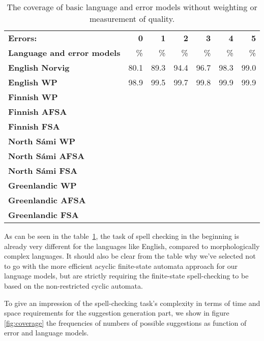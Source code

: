 \documentclass[a4paper,12pt]{article}
\begin{document}
\begin{table}
    \centering
    \begin{tabular}{|l|r|r|r||r|r|r|}
        \hline
        \bf Errors: & \bf 0  & \bf 1 & \bf 2 & \bf 3 & \bf 4 & \bf 5 \\
        \bf Language and error models &  \% & \% & \% & \% & \% & \% \\
        \hline
        \bf English Norvig & 80.1 & 89.3 & 94.4 & 96.7 & 98.3 & 99.0 \\
            \bf English WP & 98.9 & 99.5 & 99.7 & 99.8 & 99.9 & 99.9 \\
        \hline
                   \bf Finnish WP & & & & & & \\
                  \bf Finnish AFSA & & & & & & \\
                  \bf Finnish FSA & & & & & & \\
        \hline
        \bf North Sámi WP & & & & & & \\
               \bf North Sámi AFSA & & & & & & \\
               \bf North Sámi FSA & & & & & & \\
        \hline
        \bf Greenlandic WP & & & & & & \\
                 \bf Greenlandic AFSA & & & & & & \\
                  \bf Greenlandic FSA & & & & & & \\
        \hline
    \end{tabular}
    \caption{The coverage of basic language and error models without weighting
        or measurement of quality.\label{table:baseline-coverage}}
\end{table}

As can be seen in the table~\ref{table:baseline-coverage}, the task of spell
checking in the beginning is already very different for the languages like English,
compared to morphologically complex languages. It should also be
clear from the table why we've selected not to go with the more efficient
acyclic finite-state automata approach for our language models, but are
strictly requiring the finite-state spell-checking to be based on
the non-restricted cyclic automata.

To give an impression of the spell-checking task's complexity in terms of time
and space requirements for the suggestion generation part, we show in figure
\ref{fig:coverage} the frequencies of numbers of possible suggestions as
function of error and language models.
\end{document}
